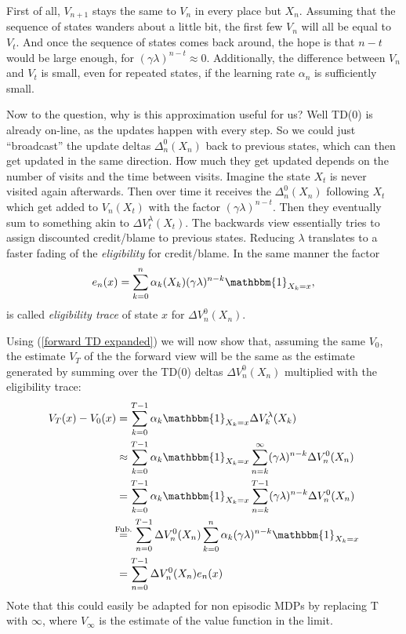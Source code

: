 First of all, \(V_{n+1}\) stays the same to \(V_n\) in every place but \(X_n\). Assuming that the sequence of states wanders about a little bit, the first few \(V_n\) will all be equal to \(V_t\). And once the sequence of states comes back around, the hope is that \(n-t\) would be large enough, for \((\gamma\lambda)^{n-t}\approx 0\). Additionally, the difference between \(V_n\) and \(V_t\) is small, even for repeated states, if the learning rate \(\alpha_n\) is sufficiently small. 

Now to the question, why is this approximation useful for us? Well TD(0) is already on-line, as the updates happen with every step. So we could just ``broadcast'' the update deltas \(\Delta_n^0(X_n)\) back to previous states, which can then get updated in the same direction. How much they get updated depends on the number of visits and the time between visits. Imagine the state \(X_t\) is never visited again afterwards. Then over time it receives the \(\Delta_n^0(X_n)\) following \(X_t\) which get added to \(V_n(X_t)\) with the factor \((\gamma\lambda)^{n-t}\). Then they eventually sum to something akin to \(\Delta V^\lambda_t(X_t)\). The backwards view essentially tries to assign discounted credit/blame to previous states. Reducing \(\lambda\) translates to a faster fading of the \emph{eligibility} for credit/blame. In the same manner the factor
\[
	e_n(x)=\sum_{k=0}^n \alpha_k(X_k)(\gamma\lambda)^{n-k} \mathbbm{1}_{X_k=x},
\]
is called \emph{eligibility trace} of state \(x\) for \(\Delta V^0_n(X_n)\). 

Using (\ref{forward TD expanded}) we will now show that, assuming the same \(V_0\), the estimate \(V_T\) of the the forward view will be the same as the estimate generated by summing over the TD(0) deltas \(\Delta V^0_n(X_n)\) multiplied with the eligibility trace:
\begin{align*}
	V_T(x)-V_0(x)&= \sum_{k=0}^{T-1} \alpha_k \mathbbm{1}_{X_k=x}
	\Delta V^\lambda_k(X_k)\\
	&\approx \sum_{k=0}^{T-1} \alpha_k \mathbbm{1}_{X_k=x}
	\sum_{n=k}^\infty(\gamma\lambda)^{n-k} \Delta V^0_n(X_n)\\
	&=\sum_{k=0}^{T-1} \alpha_k \mathbbm{1}_{X_k=x}
	\sum_{n=k}^{T-1}(\gamma\lambda)^{n-k} \Delta V^0_n(X_n)\\
	&\lxeq{\text{Fub.}}\sum_{n=0}^{T-1} \Delta V^0_n(X_n) 
	\sum_{k=0}^{n} \alpha_k (\gamma\lambda)^{n-k} \mathbbm{1}_{X_k=x}\\
	&=\sum_{n=0}^{T-1} \Delta V^0_n(X_n) e_n(x)
\end{align*}
Note that this could easily be adapted for non episodic MDPs by replacing T with \(\infty\), where \(V_\infty\) is the estimate of the value function in the limit.  

